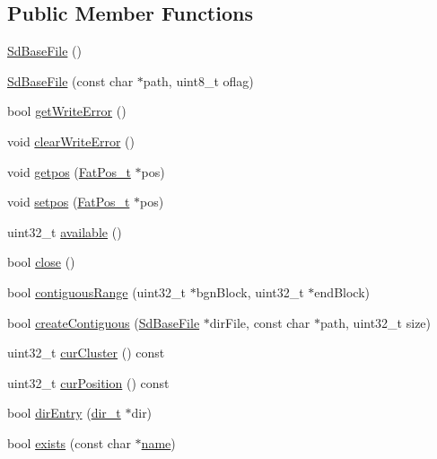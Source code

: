 \subsection*{Public Member Functions}
\begin{DoxyCompactItemize}
\item 
\hyperlink{class_sd_base_file_a9e1a71e3766b3acc8171920ada4e7717}{Sd\-Base\-File} ()
\item 
\hyperlink{class_sd_base_file_a1e2296895cd32f7269ee1cb9e2c94d92}{Sd\-Base\-File} (const char $\ast$path, uint8\-\_\-t oflag)
\item 
bool \hyperlink{class_sd_base_file_a9b199fded04cffe6a609465dce43fdcc}{get\-Write\-Error} ()
\item 
void \hyperlink{class_sd_base_file_af50f0c1e1c726ef3dee08a84456090b9}{clear\-Write\-Error} ()
\item 
void \hyperlink{class_sd_base_file_af64a10413bed83901d3f08274019d6bb}{getpos} (\hyperlink{struct_fat_pos__t}{Fat\-Pos\-\_\-t} $\ast$pos)
\item 
void \hyperlink{class_sd_base_file_a48594bc03b5a4a47cf774e01c40be1b5}{setpos} (\hyperlink{struct_fat_pos__t}{Fat\-Pos\-\_\-t} $\ast$pos)
\item 
uint32\-\_\-t \hyperlink{class_sd_base_file_af93dbeb8dc6867fcc97a7b42e2898f02}{available} ()
\item 
bool \hyperlink{class_sd_base_file_a46143fd6de3be9ab9951f140d3ae8c2f}{close} ()
\item 
bool \hyperlink{class_sd_base_file_a1934f84b25a170fbdfbee1f874c7a315}{contiguous\-Range} (uint32\-\_\-t $\ast$bgn\-Block, uint32\-\_\-t $\ast$end\-Block)
\item 
bool \hyperlink{class_sd_base_file_aa541db9563ce4a0b765b11b10f76b449}{create\-Contiguous} (\hyperlink{class_sd_base_file}{Sd\-Base\-File} $\ast$dir\-File, const char $\ast$path, uint32\-\_\-t size)
\item 
uint32\-\_\-t \hyperlink{class_sd_base_file_ab5cffcf9871ff99fc7ed9caef94d1849}{cur\-Cluster} () const 
\item 
uint32\-\_\-t \hyperlink{class_sd_base_file_a4c56d435ee4c9cbc50c6f5aaf1e5d64d}{cur\-Position} () const 
\item 
bool \hyperlink{class_sd_base_file_a5a55859ea4ca96697df8852acb2e76d1}{dir\-Entry} (\hyperlink{_sd_fat_structs_8h_a803db59d4e16a0c54a647afc6a7954e3}{dir\-\_\-t} $\ast$dir)
\item 
bool \hyperlink{class_sd_base_file_ace1cb5fa7dac7c504114b2b24ec144d2}{exists} (const char $\ast$\hyperlink{_sd_fat_structs_8h_a30308c9b983377042fd2cc8900454fb1}{name})

\end{DoxyCompactItemize}

